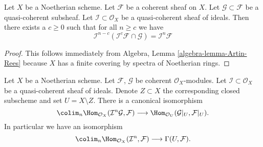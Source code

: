 \begin{lemma}
\label{lemma-Artin-Rees}
Let $X$ be a Noetherian scheme.
Let $\mathcal{F}$ be a coherent sheaf on $X$.
Let $\mathcal{G} \subset \mathcal{F}$ be a quasi-coherent subsheaf.
Let $\mathcal{I} \subset \mathcal{O}_X$ be a quasi-coherent sheaf of
ideals.
Then there exists a $c \geq 0$ such that for all $n \geq c$ we
have
$$
\mathcal{I}^{n - c}(\mathcal{I}^c\mathcal{F} \cap \mathcal{G})
=
\mathcal{I}^n\mathcal{F}
$$
\end{lemma}

\begin{proof}
This follows immediately from
Algebra, Lemma \ref{algebra-lemma-Artin-Rees}
because $X$ has a finite covering by spectra of Noetherian rings.
\end{proof}

\begin{lemma}
\label{lemma-homs-over-open}
Let $X$ be a Noetherian scheme.
Let $\mathcal{F}$, $\mathcal{G}$ be coherent $\mathcal{O}_X$-modules.
Let $\mathcal{I} \subset \mathcal{O}_X$ be a quasi-coherent sheaf of
ideals. Denote $Z \subset X$ the corresponding closed subscheme and
set $U = X \setminus Z$.
There is a canonical isomorphism
$$
\colim_n \Hom_{\mathcal{O}_X}(\mathcal{I}^n\mathcal{G}, \mathcal{F})
\longrightarrow
\Hom_{\mathcal{O}_U}(\mathcal{G}|_U, \mathcal{F}|_U).
$$
In particular we have an isomorphism
$$
\colim_n \Hom_{\mathcal{O}_X}(
\mathcal{I}^n, \mathcal{F})
\longrightarrow
\Gamma(U, \mathcal{F}).
$$
\end{lemma}

